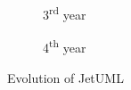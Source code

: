 \begin{figure}[ht]
    \medskip
    \begin{subfigure}{0.48\textwidth}
        \caption{3\textsuperscript{rd} year} 
        \label{fig:JetUML_V3S3}
    \end{subfigure}\hspace*{\fill}
    \begin{subfigure}{0.48\textwidth}
        \caption{4\textsuperscript{th} year} 
        \label{fig:JetUML_V3S4}
    \end{subfigure}
        
    \caption{Evolution of JetUML} 
    \label{fig:JetUML_V3}
\end{figure}

